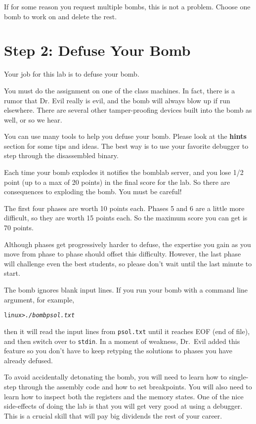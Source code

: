 \documentclass[11pt]{article}
\begin{document}
If for some reason you request multiple bombs, this is not a
problem. Choose one bomb to work on and delete the rest.

\section*{Step 2: Defuse Your Bomb}
Your job for this lab is to defuse your bomb.

You must do the assignment on one of the class machines.  In fact,
there is a rumor that Dr. Evil really is evil, and the bomb will
always blow up if run elsewhere.  There are several other
tamper-proofing devices built into the bomb as well, or so we hear.

You can use many tools to help you defuse your bomb. Please look at
the {\bf hints} section for some tips and ideas.  The best way is to
use your favorite debugger to step through the disassembled binary.

Each time your bomb explodes it notifies the bomblab server, and you lose
1/2 point (up to a max of 20 points) in the final score for the lab.
So there are consequences to exploding the bomb. You must be careful!

The first four phases are worth 10 points each. Phases 5 and 6 are a
little more difficult, so they are worth 15 points each. So the
maximum score you can get is 70 points.

Although phases get progressively harder to defuse, the expertise you
gain as you move from phase to phase should offset this
difficulty. However, the last phase will challenge even the best
students, so please don't wait until the last minute to start.

The bomb ignores blank input lines. If you run your bomb with a
command line argument, for example, 
\begin{alltt}
    linux> {\em ./bomb psol.txt}
\end{alltt}
then it will read the input lines from {\tt psol.txt} until it reaches
EOF (end of file), and then switch over to {\tt stdin}. In a moment of
weakness, Dr.~Evil added this feature so you don't have to keep
retyping the solutions to phases you have already defused.

To avoid accidentally detonating the bomb, you will need to learn how to
single-step through the assembly code and how to set breakpoints.  You
will also need to learn how to inspect both the registers and the
memory states.  One of the nice side-effects of doing the lab is that
you will get very good at using a debugger.  This is a crucial skill
that will pay big dividends the rest of your career.
\end{document}
